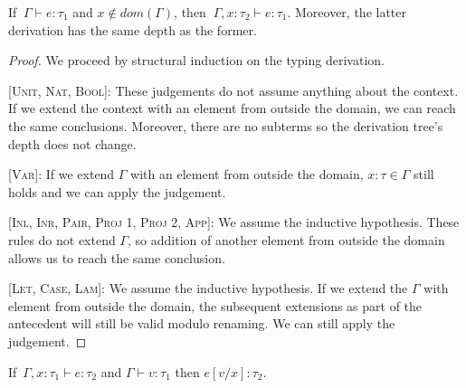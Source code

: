 \documentclass[nonacm]{acmart}
\begin{document}

\begin{lemma}[Weakening]
  If $~\Gamma \vdash e : \tau_1$ and $x \notin dom(\Gamma)$, then $~\Gamma, x : \tau_2
    \vdash e : \tau_1$. Moreover, the latter derivation has the same depth as
  the former.
\end{lemma}

\begin{proof}
  We proceed by structural induction on the typing derivation.

  [\textsc{Unit, Nat, Bool}]: These judgements do not assume anything about
  the context. If we extend the context with an element from outside the domain, we can
  reach the same conclusions. Moreover, there are no subterms so the derivation
  tree's depth does not change.

  [\textsc{Var}]: If we extend $\Gamma$ with an element from outside the domain, $x : \tau \in \Gamma$
  still holds and we can apply the judgement.

  [\textsc{Inl, Inr, Pair, Proj 1, Proj 2, App}]: We assume the inductive hypothesis.
  These rules do not extend $\Gamma$, so addition of another element from outside the domain allows us to reach the same conclusion.

  [\textsc{Let, Case, Lam}]: We assume the inductive hypothesis. If we extend the
  $\Gamma$ with element from outside the domain, the subsequent extensions as part
  of the antecedent will still be valid modulo renaming. We can still apply the judgement.
\end{proof}


\begin{lemma}[Substitution]
  If~\( \Gamma, x : \tau_1 \vdash e : \tau_2 \) and \( \Gamma \vdash v : \tau_1 \) then \( e[v/x] : \tau_2 \).
\end{lemma}
\end{document}
